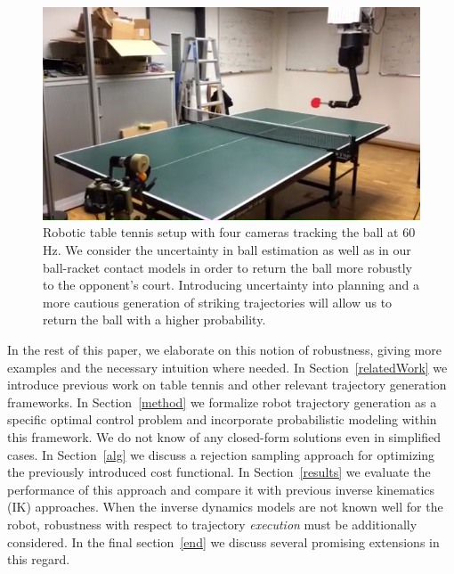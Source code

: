 \documentclass[letterpaper, 10 pt, conference]{ieeeconf}
\begin{document}

\begin{figure}[t!]
\center
\includegraphics[scale=0.4]{robot1.png}			
\caption{Robotic table tennis setup with four cameras tracking the ball at 60 Hz. We consider the uncertainty in ball estimation as well as in our ball-racket contact models in order to return the ball more robustly to the opponent's court. Introducing uncertainty into planning and a more cautious generation of striking trajectories will allow us to return the ball with a higher probability.}
\label{robot}
\end{figure}

In the rest of this paper, we elaborate on this notion of robustness, giving more examples and the necessary intuition where needed. In Section~\ref{relatedWork} we introduce previous work on table tennis and other relevant trajectory generation frameworks. In Section~\ref{method} we formalize robot trajectory generation as a specific optimal control problem and incorporate probabilistic modeling within this framework. We do not know of any closed-form solutions even in simplified cases. In Section~\ref{alg} we discuss a rejection sampling approach for optimizing the previously introduced cost functional. In Section~\ref{results} we evaluate the performance of this approach and compare it with previous inverse kinematics (IK) approaches. When the inverse dynamics models are not known well for the robot, robustness with respect to trajectory \emph{execution} must be additionally considered. In the final section~\ref{end} we discuss several promising extensions in this regard. %
\end{document}

